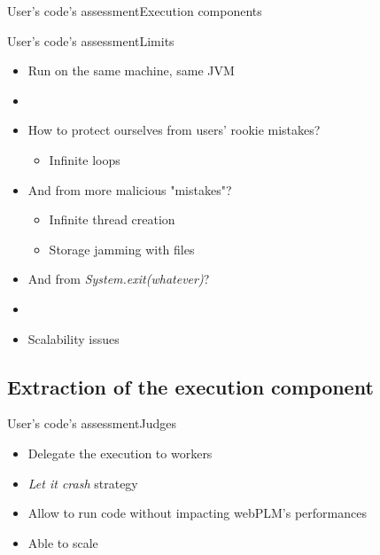 \documentclass{beamer}
\begin{document}
\begin{frame}{User's code's assessment}{Execution components}
\begin{center}
  \end{center}
\end{frame}

\begin{frame}{User's code's assessment}{Limits}
  \begin{itemize}
  \item {
    Run on the same machine, same JVM
    \pause
  }
  \item[~]
  \item {
    How to protect ourselves from users' rookie mistakes?
    \begin{itemize}
    \item {
      Infinite loops
    }
    \end{itemize}
    \pause
  }
  \item {
    And from more malicious "mistakes"?
    \begin{itemize}
    \item {
      Infinite thread creation
    }
    \item {
      Storage jamming with files
    }
    \end{itemize}
    \pause
  }
  \item {
    And from \emph{System.exit(whatever)}?
    \pause
  }
  \item[~]
  \item {
    Scalability issues
  }
  \end{itemize}
\end{frame}

\subsection{Extraction of the execution component}

\begin{frame}{User's code's assessment}{Judges}
  \begin{itemize}
  \item {
    Delegate the execution to workers
  }
  \item {
    \emph{Let it crash} strategy
  }
  \item {
    Allow to run code without impacting webPLM's performances
  }
  \item {
    Able to scale
  }
  \end{itemize}
\end{frame}
\end{document}
